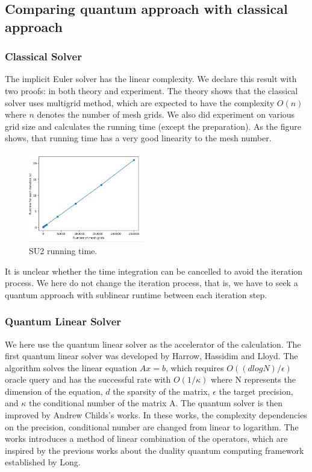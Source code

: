 \documentclass[%
 reprint,
 amsmath,amssymb,
pra,
]{revtex4-1}
\begin{document}
\subsection{Comparing quantum approach with classical approach}

\subsubsection{Classical Solver}

The implicit Euler solver has the linear complexity. We declare this result with two proofs: in both theory and experiment. The theory shows that the classical solver uses multigrid method, which are expected to have the complexity $O(n)$ where $n$ denotes the number of mesh grids. We also did experiment on various grid size and calculates the running time (except the preparation). As the figure shows, that running time has a very good linearity to the mesh number.
\begin{figure} 
\centering
\includegraphics[width=0.45\textwidth]{Fig/su2_speed.png}
\caption{SU2 running time.} \label{su2Speed}
\end{figure}

It is unclear whether the time integration can be cancelled to avoid the iteration process. We here do not change the iteration process, that is, we have to seek a quantum approach with sublinear runtime between each iteration step.

\subsubsection{Quantum Linear Solver}

We here use the quantum linear solver as the accelerator of the calculation. The first quantum linear solver was developed by Harrow, Hassidim and Lloyd. The algorithm solves the linear equation $Ax = b$, which requires $O((d log⁡N)/\epsilon)$ oracle query and has the successful rate with $O(1/\kappa)$ where N represents the dimension of the equation, $d$ the sparsity of the matrix, $\epsilon$ the target precision, and $\kappa$ the conditional number of the matrix A. The quantum solver is then improved by Andrew Childs’s works. In these works, the complexity dependencies on the precision, conditional number are changed from linear to logarithm. The works introduces a method of linear combination of the operators, which are inspired by the previous works about the duality quantum computing framework established by Long.
\end{document}
